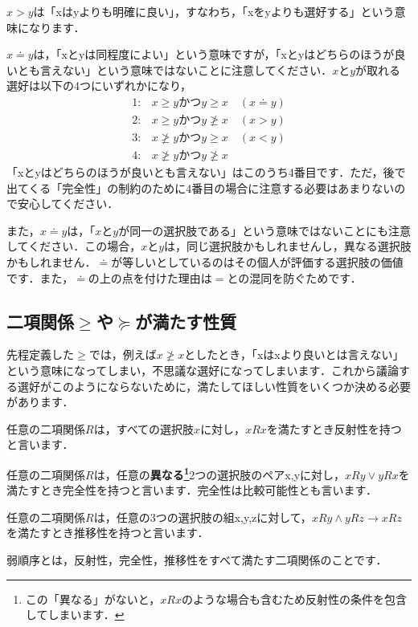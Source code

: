 $x>y$は「xはyよりも明確に良い」，すなわち，「xをyよりも選好する」という意味になります．

$x\doteq y$は，「xとyは同程度によい」という意味ですが，「xとyはどちらのほうが良いとも言えない」という意味ではないことに注意してください．$x$と$y$が取れる選好は以下の4つにいずれかになり，
\begin{align*}
    1 :& x \geq y かつ y \geq x \hspace{1em} (x \doteq y) \\
    2 :& x \geq y かつ y \not \geq x \hspace{1em} (x > y) \\
    3 :& x \not \geq y かつ y \geq x \hspace{1em} (x < y) \\
    4 :& x \not \geq y かつ y \not \geq x \hspace{1em} 
\end{align*}
「xとyはどちらのほうが良いとも言えない」はこのうち4番目です．ただ，後で出てくる「完全性」の制約のために4番目の場合に注意する必要はあまりないので安心してください．

また，$x\doteq y$は，「$x$と$y$が同一の選択肢である」という意味ではないことにも注意してください．この場合，$x$と$y$は，同じ選択肢かもしれませんし，異なる選択肢かもしれません．$\doteq$が等しいとしているのはその個人が評価する選択肢の価値です．また，$\doteq$の上の点を付けた理由は$=$との混同を防ぐためです．

\subsection{二項関係$\geq$や$\succeq$が満たす性質}
先程定義した$\geq$では，例えば$x \not \geq x$としたとき，「xはxより良いとは言えない」という意味になってしまい，不思議な選好になってしまいます．これから議論する選好がこのようにならないために，満たしてほしい性質をいくつか決める必要があります．
\begin{dfn}[反射性]
    任意の二項関係$R$は，すべての選択肢$x$に対し，$x R x$を満たすとき反射性を持つと言います．
\end{dfn}
\begin{dfn}[完全性]
    任意の二項関係$R$は，任意の{\bf 異なる\footnote{この「異なる」がないと，$xRx$のような場合も含むため反射性の条件を包含してしまいます．}}2つの選択肢のペアx,yに対し，$x R y \lor y R x$を満たすとき完全性を持つと言います．完全性は比較可能性とも言います．
\end{dfn}
\begin{dfn}[推移性]
    任意の二項関係$R$は，任意の3つの選択肢の組x,y,zに対して，$x R y \land y R z \to x R z$を満たすとき推移性を持つと言います．
\end{dfn}
\begin{dfn}
    弱順序とは，反射性，完全性，推移性をすべて満たす二項関係のことです．
\end{dfn}

